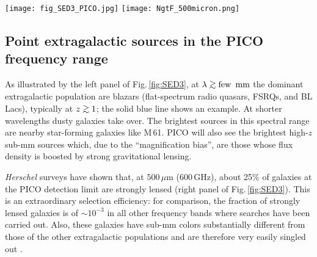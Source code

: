 \documentclass[11pt,a4paper]{article}
\def\simgt{\mathrel{\rlap{\lower 3pt\hbox{$\sim$}} \raise2.0pt\hbox{$>$}}}
\begin{document}







\def\mission{CMB Probe\ }




\begin{figure*}
\begin{center}
\texttt{[image: fig\_SED3\_PICO.jpg]}
\texttt{[image: NgtF\_500micron.png]}
\caption{\textbf{Left panel.} Examples of SEDs of extragalactic sources detectable by PICO, compared with its point source detection limits (solid black line). The SED of M\,61 has been scaled down by a factor of 10. The 90\% completeness limits of the Second \textit{Planck} Catalogue of Compact Sources (PCCS2; \cite{PCCS2}) are also shown.  \textbf{Right panel.} Integral counts of the various populations of extragalactic sources at $500\,\mu$m as determined by \textit{Herschel} surveys. The vertical red line shows the estimated PICO detection limit.}
\label{fig:SED3}
\end{center}
\end{figure*}

\subsection{Point extragalactic sources in the PICO frequency range}

As illustrated by the left panel of Fig.\,\ref{fig:SED3}, at $\lambda \simgt \hbox{few\, mm}$ the dominant extragalactic population are blazars (flat-spectrum radio quasars, FSRQs, and BL Lacs), typically at $z\simgt 1$; the solid blue line shows an example. At shorter wavelengths dusty galaxies take over. The brightest sources in this spectral range are nearby  star-forming galaxies like M\,61. PICO will also see the brightest high-$z$ sub-mm sources which, due to the ``magnification bias'', are those whose flux density is boosted by strong gravitational lensing.

\textit{Herschel} surveys have shown that, at $500\,\mu$m (600\,GHz), about 25\% of galaxies at the PICO detection limit are strongly lensed (right panel of Fig.\,\ref{fig:SED3}). This is an extraordinary selection efficiency: for   comparison, the fraction of strongly lensed galaxies is of $\sim 10^{-3}$ in all other frequency bands where searches have been carried out. Also, these galaxies have sub-mm colors substantially different from those of the other extragalactic populations and are therefore very easily singled out \cite{Negrello2017lensed}.
\end{document}
